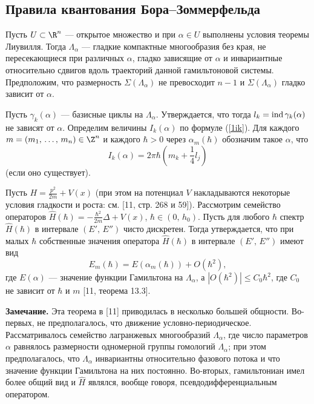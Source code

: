 \documentclass[a4paper
]{article}
\begin{document}
\subsection{Правила квантования Бора--Зоммерфельда}
Пусть $U\subset \R^n$ --- открытое множество и при $\alpha\in U$
выполнены условия теоремы Лиувилля. Тогда $\Lambda_\alpha$ ---
гладкие компактные многообразия без края, не пересекающиеся при различных
$\alpha$, гладко зависящие от $\alpha$ и инвариантные относительно
сдвигов вдоль траекторий данной гамильтоновой системы. Предположим,
что размерность $\Sigma(\Lambda_\alpha)$ не превосходит $n-1$ и
$\Sigma(\Lambda_\alpha)$ гладко зависит от $\alpha$. \par
Пусть $\gamma_k(\alpha)$ --- базисные циклы на $\Lambda_\alpha$.
Утверждается, что тогда $l_k={\rm ind}\, \gamma_k(\alpha)$ не зависят
от $\alpha$. Определим величины $I_k(\alpha)$ по формуле (\ref{1ik}).
Для каждого $m=(m_1, \, \dots, \, m_n)\in \Z^n$ и каждого $\hbar>0$
через $\alpha_m(\hbar)$ обозначим такое $\alpha$, что $$I_k(\alpha)=
2\pi\hbar\left(m_k+\frac14 l_j\right)$$ (если оно существует). \par
Пусть $H=\frac{p^2}{2m}+V(x)$ (при этом на потенциал $V$ накладываются
некоторые условия гладкости и роста: см. [11, стр. 268 и 59]). Рассмотрим
семейство операторов $\hat H(\hbar)=-\frac{\hbar^2}{2m}\Delta+V(x)$,
$\hbar\in (0, \, h_0)$. Пусть для любого $\hbar$ спектр $\hat H(\hbar)$
в интервале $(E', \, E'')$ чисто дискретен. Тогда утверждается, что
при малых $\hbar$ собственные значения оператора $\hat H(\hbar)$ в
интервале $(E', \, E'')$ имеют вид $$E_m(\hbar)=E(\alpha_m(\hbar))+O(\hbar^2),$$
где $E(\alpha)$ --- значение функции Гамильтона на $\Lambda_\alpha$,
а $|O(\hbar^2)|\le C_0\hbar^2$, где $C_0$ не зависит от $\hbar$ и $m$
[11, теорема 13.3]. \par
{\bf Замечание.} Эта теорема в [11] приводилась в несколько большей
общности. Во-первых,  не предполагалось, что движение условно-периодическое.
Рассматривалось семейство лагранжевых многообразий $\Lambda_\alpha$, где
число параметров $\alpha$ равнялось размерности одномерной группы
гомологий $\Lambda_\alpha$; при этом предполагалось, что $\Lambda_\alpha$
инвариантны относительно фазового потока и что значение функции
Гамильтона на них постоянно. Во-вторых, гамильтониан имел более общий
вид и $\hat H$ являлся, вообще говоря, псевдодифференциальным оператором.
\end{document}

